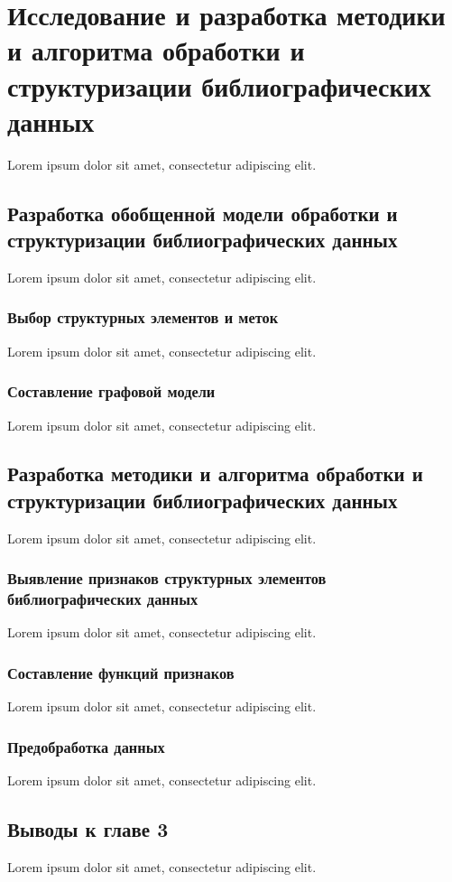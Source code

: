 \chapter{Исследование и разработка методики и алгоритма обработки и структуризации библиографических данных}
Lorem ipsum dolor sit amet, consectetur adipiscing elit.

\section{Разработка обобщенной модели обработки и структуризации библиографических данных}
Lorem ipsum dolor sit amet, consectetur adipiscing elit.

\subsection{Выбор структурных элементов и меток}
Lorem ipsum dolor sit amet, consectetur adipiscing elit.

\subsection{Составление графовой модели}
Lorem ipsum dolor sit amet, consectetur adipiscing elit.

\section{Разработка методики и алгоритма обработки и структуризации библиографических данных}
Lorem ipsum dolor sit amet, consectetur adipiscing elit.

\subsection{Выявление признаков структурных элементов библиографических данных}
Lorem ipsum dolor sit amet, consectetur adipiscing elit.

\subsection{Составление функций признаков}
Lorem ipsum dolor sit amet, consectetur adipiscing elit.

\subsection{Предобработка данных}
Lorem ipsum dolor sit amet, consectetur adipiscing elit.

\section*{Выводы к главе 3}
Lorem ipsum dolor sit amet, consectetur adipiscing elit.
